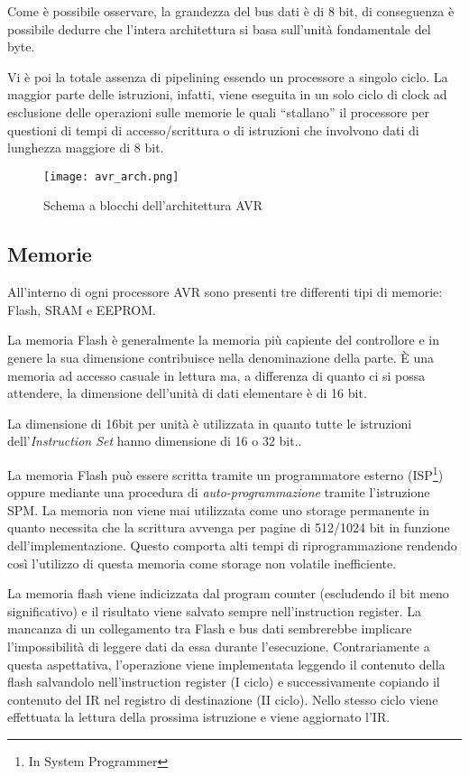 Come è possibile osservare, la grandezza del bus dati è di 8 bit, di conseguenza è possibile dedurre che l'intera architettura si basa sull'unità fondamentale del byte.

Vi è poi la totale assenza di pipelining essendo un processore a singolo ciclo. La maggior parte delle istruzioni, infatti, viene eseguita in un solo ciclo di clock\cite{avr:m328p} ad esclusione delle operazioni sulle memorie le quali ``stallano'' il processore per questioni di tempi di accesso/scrittura o di istruzioni che involvono dati di lunghezza maggiore di 8 bit.

\begin{figure}[t]
    \centering
    \texttt{[image: avr\_arch.png]}
    \caption[]{Schema a blocchi dell'architettura AVR\cite{avr:m328p}}\label{fig:avr-arch}
\end{figure}

\subsection{Memorie}

All'interno di ogni processore AVR sono presenti tre differenti tipi di memorie: Flash, SRAM e EEPROM.

La memoria Flash è generalmente la memoria più capiente del controllore e in genere la sua dimensione contribuisce nella denominazione della parte. È una memoria ad accesso casuale in lettura ma, a differenza di quanto ci si possa attendere, la dimensione dell'unità di dati elementare è di 16 bit.

La dimensione di 16bit per unità è utilizzata in quanto tutte le istruzioni dell'\textit{Instruction Set} hanno dimensione di 16 o 32 bit.\cite{avr:isa}.

La memoria Flash può essere scritta tramite un programmatore esterno (ISP\footnote{In System Programmer}) oppure mediante una procedura di \textit{auto-programmazione} tramite l'istruzione SPM.
La memoria non viene mai utilizzata come uno storage permanente in quanto necessita che la scrittura avvenga per pagine di 512/1024 bit in funzione dell'implementazione. Questo comporta alti tempi di riprogrammazione rendendo così l'utilizzo di questa memoria come storage non volatile inefficiente.

La memoria flash viene indicizzata dal program counter (escludendo il bit meno significativo) e il risultato viene salvato sempre nell'instruction register. 
La mancanza di un collegamento tra Flash e bus dati sembrerebbe implicare l'impossibilità di leggere dati da essa durante l'esecuzione. 
Contrariamente a questa aspettativa, l'operazione viene implementata leggendo il contenuto della flash salvandolo nell'instruction register (I ciclo) e successivamente copiando il contenuto del IR nel registro di destinazione (II ciclo). Nello stesso ciclo viene effettuata la lettura della prossima istruzione e viene aggiornato l'IR. 

